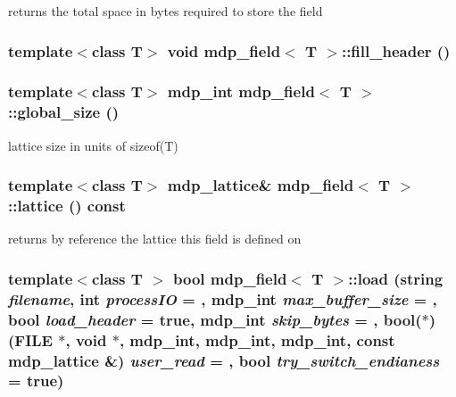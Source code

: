 returns the total space in bytes required to store the field \hypertarget{classmdp__field_ad3ad6161829f9bf07fc4dd607d71e0ea}{
\subsubsection[{fill\_\-header}]{\setlength{\rightskip}{0pt plus 5cm}template$<$class T$>$ void {\bf mdp\_\-field}$<$ T $>$::fill\_\-header ()}}
\label{classmdp__field_ad3ad6161829f9bf07fc4dd607d71e0ea}
\hypertarget{classmdp__field_a4deb091e1da25d239e206ee8ff64ae11}{
\subsubsection[{global\_\-size}]{\setlength{\rightskip}{0pt plus 5cm}template$<$class T$>$ {\bf mdp\_\-int} {\bf mdp\_\-field}$<$ T $>$::global\_\-size ()}}
\label{classmdp__field_a4deb091e1da25d239e206ee8ff64ae11}


lattice size in units of sizeof(T) \hypertarget{classmdp__field_a31b1149be220cdeeb72281163579f3bc}{
\subsubsection[{lattice}]{\setlength{\rightskip}{0pt plus 5cm}template$<$class T$>$ {\bf mdp\_\-lattice}\& {\bf mdp\_\-field}$<$ T $>$::lattice () const}}
\label{classmdp__field_a31b1149be220cdeeb72281163579f3bc}


returns by reference the lattice this field is defined on \hypertarget{classmdp__field_a21ce8e89744a826abdc9f5325c714892}{
\subsubsection[{load}]{\setlength{\rightskip}{0pt plus 5cm}template$<$class T $>$ bool {\bf mdp\_\-field}$<$ T $>$::load (string {\em filename}, \/  int {\em processIO} = {}, \/  {\bf mdp\_\-int} {\em max\_\-buffer\_\-size} = {}, \/  bool {\em load\_\-header} = {\ttfamily true}, \/  {\bf mdp\_\-int} {\em skip\_\-bytes} = {}, \/  bool($\ast$)(FILE $\ast$, void $\ast$, {\bf mdp\_\-int}, {\bf mdp\_\-int}, {\bf mdp\_\-int}, const {\bf mdp\_\-lattice} \&) {\em user\_\-read} = {}, \/  bool {\em try\_\-switch\_\-endianess} = {\ttfamily true})}}
\label{classmdp__field_a21ce8e89744a826abdc9f5325c714892}


